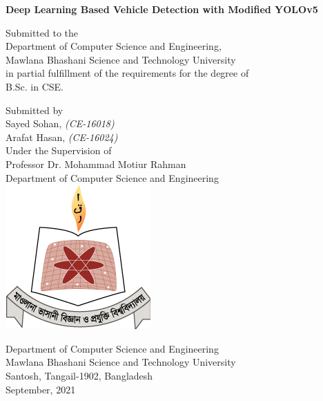 \begin{titlepage}
\begin{center}
    \LARGE{
    \textbf{Deep Learning Based Vehicle Detection with Modified YOLOv5}}
    
    \vspace{2.5cm}
    \small{Submitted to the}\\
    \large{Department of Computer Science and Engineering,}\\
    \normalsize{Mawlana Bhashani Science and Technology University\\
    in partial fulfillment of the requirements for the degree of\\
    B.Sc. in CSE.}
    
    \vspace{1cm}

    \small{Submitted by}\\
    \large{Sayed Sohan, \small{\textit{(CE-16018)}}}\\
    \large{Arafat Hasan, \small{\textit{(CE-16024)}}}\\
    
    \vspace{1cm}
    \small
     {Under the Supervision of}\\
     \large{Professor Dr. Mohammad Motiur Rahman}\\
     \normalsize{Department of Computer Science and Engineering}\\
    
    \vspace{3cm}
    \includegraphics[scale=0.3]{images/logo.png}
    
    \vspace{0cm}
    
    \normalsize{Department of Computer Science and Engineering}\\
    \small{Mawlana Bhashani Science and Technology University\\
    Santosh, Tangail-1902, Bangladesh\\
    \vspace{0.5cm}
    September, 2021}
    
\end{center}
\end{titlepage}